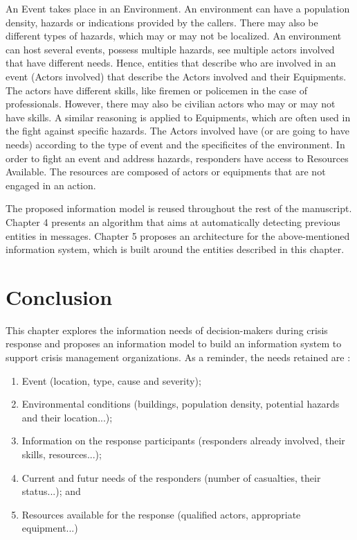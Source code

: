 An Event takes place in an Environment.
An environment can have a population density, hazards or indications provided by the callers.
There may also be different types of hazards, which may or may not be localized.
An environment can host several events, possess multiple hazards, see multiple actors involved
that have different needs.
Hence, entities that describe who are involved in an event (Actors involved) that describe the
Actors involved and their Equipments.
The actors have different skills, like firemen or policemen in the case of professionals.
However, there may also be civilian actors who may or may not have skills.
A similar reasoning is applied to Equipments, which are often used in the fight against specific hazards.
The Actors involved have (or are going to have needs) according to the type of event and the
specificites of the environment.
In order to fight an event and address hazards, responders have access to Resources Available.
The resources are composed of actors or equipments that are not engaged in an action.

The proposed information model is reused throughout the rest of the manuscript.
Chapter 4 presents an algorithm that aims at automatically detecting previous entities in messages.
Chapter 5 proposes an architecture for the above-mentioned information system, which is built around the entities described in this chapter.

\section{Conclusion}
This chapter explores the information needs of decision-makers during crisis response and
proposes an information model to build an information system to support crisis management organizations.
As a reminder, the needs retained are :

\begin{enumerate}
    \item Event (location, type, cause and severity);
    \item Environmental conditions (buildings, population density, potential hazards and their location...);
    \item Information on the response participants (responders already involved, their skills, resources...);
    \item Current and futur needs of the responders (number of casualties, their status...); and
    \item Resources available for the response (qualified actors, appropriate equipment...)
\end{enumerate}

